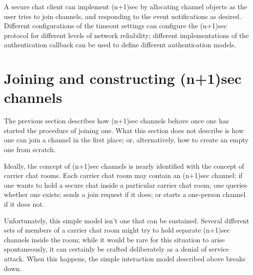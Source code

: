 \documentclass{article}
\begin{document}
A secure chat client can implement (n+1)sec by allocating channel objects as the user tries to join channels, and responding to the event notifications as desired.
Different configurations of the timeout settings can configure the (n+1)sec protocol for different levels of network reliability; different implementations of the authentication callback can be used to define different authentication models.

\section{Joining and constructing (n+1)sec channels}
\label{sec:joining-and-constructing-np1sec-channels}

The previous section describes how (n+1)sec channels behave once one has started the procedure of joining one.
What this section does not describe is how one can join a channel in the first place; or, alternatively, how to create an empty one from scratch.

Ideally, the concept of (n+1)sec channels is nearly identified with the concept of carrier chat rooms.
Each carrier chat room may contain an (n+1)sec channel; if one wants to hold a secure chat inside a particular carrier chat room, one queries whether one exists; sends a join request if it does; or starts a one-person channel if it does not.

Unfortunately, this simple model isn't one that can be sustained.
Several different sets of members of a carrier chat room might try to hold separate (n+1)sec channels inside the room; while it would be rare for this situation to arise spontaneously, it can certainly be crafted deliberately as a denial of service attack.
When this happens, the simple interaction model described above breaks down.
\end{document}
